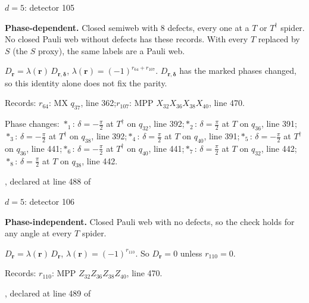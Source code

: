 \label{d5_det105}
{\Large $d=5$: detector 105}\par
\textbf{Phase-dependent.} Closed semiweb with 8 defects, every one at a $T$ or $T^\dagger$ spider. No closed Pauli web without defects has these records. With every $T$ replaced by $S$ (the $S$ proxy), the same labels are a Pauli web.
\begin{center}
\end{center}
\vspace{-1mm}
$D_{\boldsymbol r}=\lambda(\boldsymbol r)\,D_{\boldsymbol r,\boldsymbol\delta}$, \quad $\lambda(\boldsymbol r)=(-1)^{r_{64}+r_{107}}$. \qquad $D_{\boldsymbol r,\boldsymbol\delta}$ has the marked phases changed, so this identity alone does not fix the parity.
\par\smallskip\begin{minipage}{.98\linewidth}\small Records: $r_{64}$: MX $q_{37}$, line 362;\quad $r_{107}$: MPP $X_{32}X_{36}X_{38}X_{40}$, line 470.\end{minipage}
\par\smallskip\begin{minipage}{.98\linewidth}\small Phase changes: $\ast_{1}$: $\delta=-\frac{\pi}{2}$ at $T^\dagger$ on $q_{32}$, line 392;\quad $\ast_{2}$: $\delta=\frac{\pi}{2}$ at $T$ on $q_{36}$, line 391;\quad $\ast_{3}$: $\delta=-\frac{\pi}{2}$ at $T^\dagger$ on $q_{38}$, line 392;\quad $\ast_{4}$: $\delta=\frac{\pi}{2}$ at $T$ on $q_{40}$, line 391;\quad $\ast_{5}$: $\delta=-\frac{\pi}{2}$ at $T^\dagger$ on $q_{36}$, line 441;\quad $\ast_{6}$: $\delta=-\frac{\pi}{2}$ at $T^\dagger$ on $q_{40}$, line 441;\quad $\ast_{7}$: $\delta=\frac{\pi}{2}$ at $T$ on $q_{32}$, line 442;\quad $\ast_{8}$: $\delta=\frac{\pi}{2}$ at $T$ on $q_{38}$, line 442.\end{minipage}
\vfill
{\footnotesize\texttt{}, declared at line 488 of \texttt{}}
\newpage

\label{d5_det106}
{\Large $d=5$: detector 106}\par
\textbf{Phase-independent.} Closed Pauli web with no defects, so the check holds for any angle at every $T$ spider.
\begin{center}
\end{center}
\vspace{-1mm}
$D_{\boldsymbol r}=\lambda(\boldsymbol r)\,D_{\boldsymbol r}$, \quad $\lambda(\boldsymbol r)=(-1)^{r_{110}}$. \qquad So $D_{\boldsymbol r}=0$ unless $r_{110}=0$.
\par\smallskip\begin{minipage}{.98\linewidth}\small Records: $r_{110}$: MPP $Z_{32}Z_{36}Z_{38}Z_{40}$, line 470.\end{minipage}
\vfill
{\footnotesize\texttt{}, declared at line 489 of \texttt{}}
\newpage
